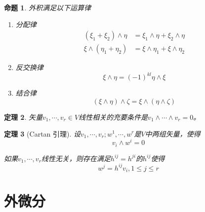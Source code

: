 \documentclass[winfonts,UTF8,c5size,a4paper,fancyhdr,hyperref,titlepage,nocap]{ctexart}
\newtheorem{thm}{定理}
\newtheorem{prop}[thm]{命题}
\theoremstyle{definition}
\theoremstyle{remark}
\numberwithin{equation}{subsection}
\begin{document}
\begin{prop}
  外积满足以下运算律
\begin{enumerate}[1)]
    \setlength{\itemindent}{2ex}
    \item 分配律
    \begin{align*}
      (\xi_1+\xi_2)\wedge\eta&=\xi_1\wedge\eta+\xi_2\wedge\eta\\
      \xi\wedge(\eta_1+\eta_2)&=\xi\wedge\eta_1+\xi\wedge\eta_2
    \end{align*}
    \item 反交换律
    \begin{equation*}
      \xi\wedge\eta=(-1)^{kl}\eta\wedge\xi
    \end{equation*}
    \item 结合律
    \begin{equation*}
      (\xi\wedge\eta)\wedge\zeta=\xi\wedge(\eta\wedge\zeta)
    \end{equation*}
\end{enumerate}
\end{prop}
\begin{thm}
  矢量$v_1,\cdots,v_r\in V$线性相关的充要条件是$v_1\wedge\cdots\wedge v_r=0$。
\end{thm}
\begin{thm}[Cartan 引理]
设$v_1,\cdots,v_r;w^1,\cdots,w^r$是$V$中两组矢量，使得
\begin{equation*}
v_i\wedge w^i=0
\end{equation*}

如果$v_1,\cdots,v_r$线性无关，则存在满足$h^{ij}=h^{ji}$的$h^{ij}$使得
\begin{equation*}
w^j=h^{ij}v_i, 1\leqslant j\leqslant r
\end{equation*}
\end{thm}

\section{外微分}
\end{document}
